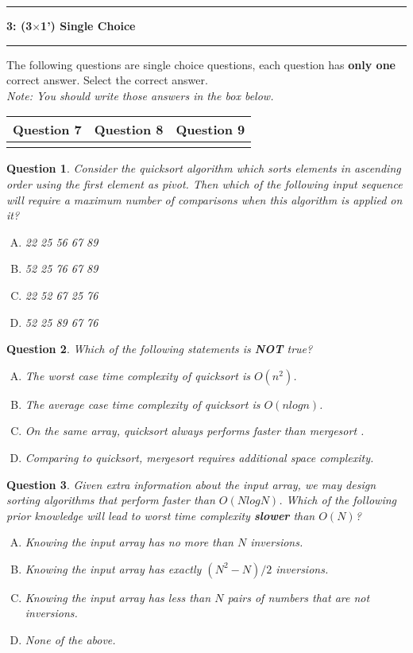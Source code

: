\documentclass[10.5pt]{article}
\newcommand\question[2]{\vspace{.25in}\hrule\textbf{#1: #2}\vspace{.5em}\hrule\vspace{.10in}}
\newtheorem{Q}{Question}
\begin{document}
\pagebreak
\question{3}{(3$\times$1') Single Choice}
The following \textit{} questions are single choice questions, each question has \textbf{only one} correct answer. Select the correct answer.\\
\textit{Note: You should write those answers in the box below.}

\begin{table}[htbp]
	\begin{tabular}{|p{2cm}|p{2cm}|p{2cm}|}
		\hline 
		Question 7 & Question 8 & Question 9\\
		\hline 
		& & \\ 
		\hline 
	\end{tabular} 
\end{table}

    \begin{Q}
		Consider the quicksort algorithm which sorts elements in ascending order using the first element as pivot. Then which of the following input sequence will require a maximum number of comparisons when this algorithm is applied on it?
		\begin{enumerate}[(A)]
			\item 22 25 56 67 89
			\item 52 25 76 67 89
			\item 22 52 67 25 76
			\item 52 25 89 67 76
		\end{enumerate}
	\end{Q}
	\vspace{0.5cm}
	\begin{Q}
		Which of the following statements is \textbf{NOT} true?
		\begin{enumerate}[(A)]
			\item The worst case time complexity of quicksort is $O(n^2)$.
			\item The average case time complexity of quicksort is $O(nlogn)$.
			\item On the same array, quicksort always performs faster than mergesort .
			\item Comparing to quicksort, mergesort requires additional space complexity.
		\end{enumerate}
	\end{Q}
	\vspace{0.5cm}
	\begin{Q} Given extra information about the input array, we may design sorting algorithms that perform faster than $O(N log N)$. Which of the following prior knowledge will lead to worst time complexity \textbf{slower} than $O(N)$?
		\begin{enumerate}[(A)]
			\item Knowing the input array has no more than $N$ inversions.
			\item Knowing the input array has exactly $(N^2-N)/2$ inversions.
			\item Knowing the input array has less than $N$ pairs of numbers that are not inversions.
			\item None of the above.
		\end{enumerate}
	\end{Q}
	\pagebreak
\end{document}
